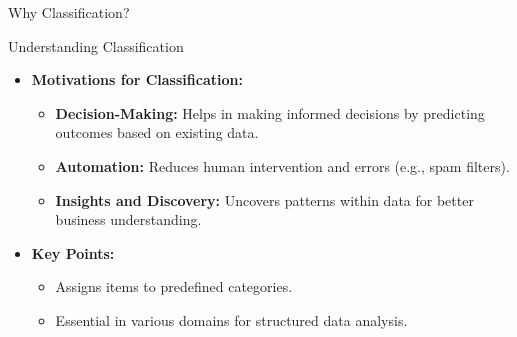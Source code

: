 \documentclass[aspectratio=169]{beamer}
\begin{document}
\begin{frame}[fragile]{Why Classification?}
  \begin{block}{Understanding Classification}
    \begin{itemize}
      \item \textbf{Motivations for Classification:}
      \begin{itemize}
        \item \textbf{Decision-Making:} Helps in making informed decisions by predicting outcomes based on existing data.
        \item \textbf{Automation:} Reduces human intervention and errors (e.g., spam filters).
        \item \textbf{Insights and Discovery:} Uncovers patterns within data for better business understanding.
      \end{itemize}
      \item \textbf{Key Points:}
      \begin{itemize}
        \item Assigns items to predefined categories.
        \item Essential in various domains for structured data analysis.
      \end{itemize}
    \end{itemize}
  \end{block}
\end{frame}
\end{document}
